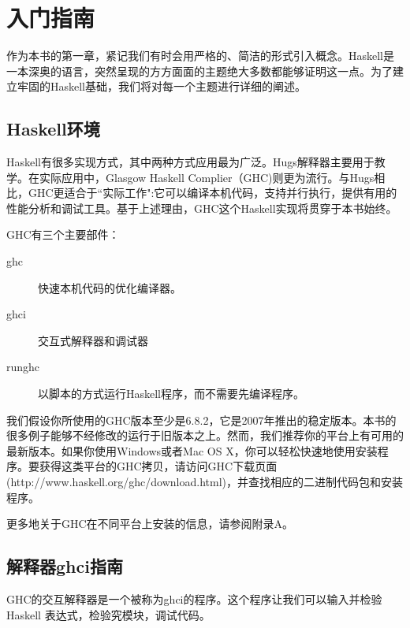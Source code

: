 \chapter{入门指南}
作为本书的第一章，紧记我们有时会用严格的、简洁的形式引入概念。Haskell是一本深奥的语言，突然呈现的方方面面的主题绝大多数都能够证明这一点。为了建立牢固的Haskell基础，我们将对每一个主题进行详细的阐述。
\section{Haskell环境}
Haskell有很多实现方式，其中两种方式应用最为广泛。Hugs解释器主要用于教学。在实际应用中，Glasgow Haskell Complier（GHC)则更为流行。与Hugs相比，GHC更适合于“实际工作":它可以编译本机代码，支持并行执行，提供有用的性能分析和调试工具。基于上述理由，GHC这个Haskell实现将贯穿于本书始终。

GHC有三个主要部件：

\begin{description}
\item[ghc]
快速本机代码的优化编译器。
\item[ghci]
交互式解释器和调试器
\item[runghc]
以脚本的方式运行Haskell程序，而不需要先编译程序。
\end{description}

我们假设你所使用的GHC版本至少是6.8.2，它是2007年推出的稳定版本。本书的很多例子能够不经修改的运行于旧版本之上。然而，我们推荐你的平台上有可用的最新版本。如果你使用Windows或者Mac OS X，你可以轻松快速地使用安装程序。要获得这类平台的GHC拷贝，请访问GHC下载页面(http://www.haskell.org/ghc/download.html)，并查找相应的二进制代码包和安装程序。

更多地关于GHC在不同平台上安装的信息，请参阅附录A。

\section{解释器ghci指南}
GHC的交互解释器是一个被称为ghci的程序。这个程序让我们可以输入并检验Haskell 表达式，检验究模块，调试代码。

\endinput